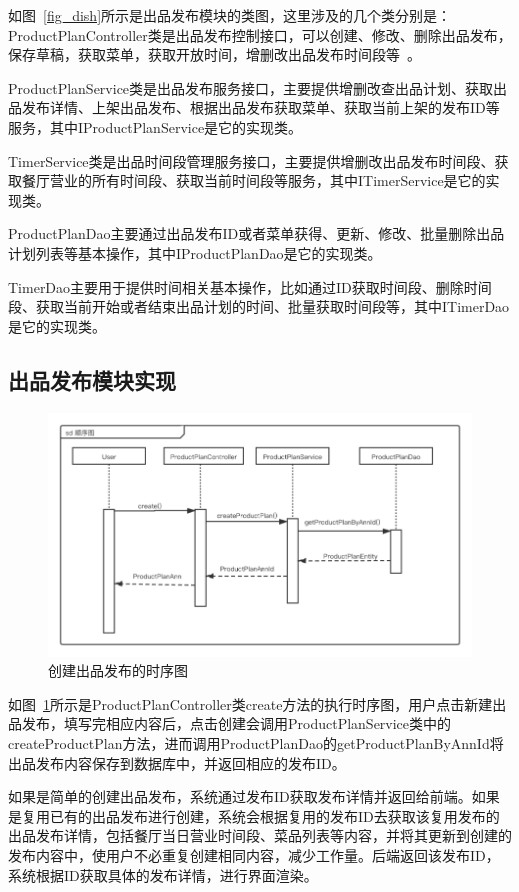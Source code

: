 如图~\ref{fig_dish}所示是出品发布模块的类图，这里涉及的几个类分别是：ProductPlanController类是出品发布控制接口，可以创建、修改、删除出品发布，保存草稿，获取菜单，获取开放时间，增删改出品发布时间段等~\cite{abf}。

ProductPlanService类是出品发布服务接口，主要提供增删改查出品计划、获取出品发布详情、上架出品发布、根据出品发布获取菜单、获取当前上架的发布ID等服务，其中IProductPlanService是它的实现类。

TimerService类是出品时间段管理服务接口，主要提供增删改出品发布时间段、获取餐厅营业的所有时间段、获取当前时间段等服务，其中ITimerService是它的实现类。

ProductPlanDao主要通过出品发布ID或者菜单获得、更新、修改、批量删除出品计划列表等基本操作，其中IProductPlanDao是它的实现类。

TimerDao主要用于提供时间相关基本操作，比如通过ID获取时间段、删除时间段、获取当前开始或者结束出品计划的时间、批量获取时间段等，其中ITimerDao是它的实现类。\\

\subsection{出品发布模块实现}

\begin{figure}[htbp!]
    \centering
    \includegraphics[width=4.5in]{FIGs/chapter4/dish_time.pdf}
    \caption{创建出品发布的时序图}\label{fig_dish_time}
\end{figure}

如图~\ref{fig_dish_time}所示是ProductPlanController类create方法的执行时序图，用户点击新建出品发布，填写完相应内容后，点击创建会调用ProductPlanService类中的createProductPlan方法，进而调用ProductPlanDao的getProductPlanByAnnId将出品发布内容保存到数据库中，并返回相应的发布ID。

如果是简单的创建出品发布，系统通过发布ID获取发布详情并返回给前端。如果是复用已有的出品发布进行创建，系统会根据复用的发布ID去获取该复用发布的出品发布详情，包括餐厅当日营业时间段、菜品列表等内容，并将其更新到创建的发布内容中，使用户不必重复创建相同内容，减少工作量。后端返回该发布ID，系统根据ID获取具体的发布详情，进行界面渲染。

